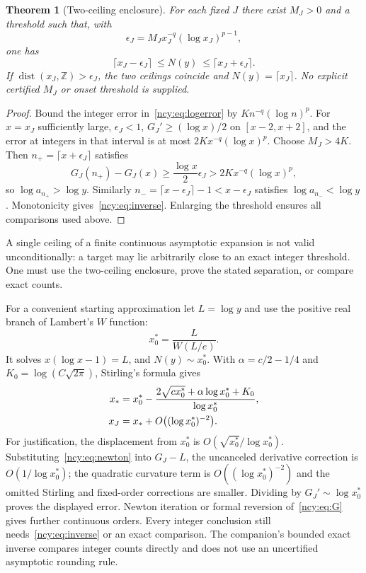 \documentclass[11pt,letterpaper]{article}
\numberwithin{equation}{section}
\newtheorem{theorem}{Theorem}[section]
\theoremstyle{remark}\newtheorem{remark}[theorem]{Remark}
\newcommand{\dist}{\operatorname{dist}}
\theoremstyle{definition}\newtheorem{definition}[theorem]{Definition}\theoremstyle{plain}
\begin{document}
\begin{theorem}[Two-ceiling enclosure]\label{ncy:thm:inverse}
For each fixed $J$ there exist $M_J>0$ and a threshold such that, with
\[
 \epsilon_J=M_Jx_J^{-q}(\log x_J)^{p-1},
\]
one has
\begin{equation}\label{ncy:eq:inverse}
 \lceil x_J-\epsilon_J\rceil\ \leq N(y)\ \leq
                       \lceil x_J+\epsilon_J\rceil.
\end{equation}
If $\dist(x_J,\mathbb Z)>\epsilon_J$, the two ceilings coincide and
$N(y)=\lceil x_J\rceil$. No explicit certified $M_J$ or onset threshold
is supplied.
\end{theorem}
\begin{proof}
Bound the integer error in~\eqref{ncy:eq:logerror} by
$Kn^{-q}(\log n)^p$. For $x=x_J$ sufficiently large,
$\epsilon_J<1$, $G_J'\geq(\log x)/2$ on $[x-2,x+2]$, and the
error at integers in that interval is at most $2Kx^{-q}(\log x)^p$.
Choose $M_J>4K$. Then $n_+=\lceil x+\epsilon_J\rceil$ satisfies
\[
 G_J(n_+)-G_J(x)\geq\frac{\log x}{2}\epsilon_J
                       >2Kx^{-q}(\log x)^p,
\]
so $\log a_{n_+}>\log y$. Similarly
$n_-=\lceil x-\epsilon_J\rceil-1<x-\epsilon_J$ satisfies
$\log a_{n_-}<\log y$. Monotonicity gives~\eqref{ncy:eq:inverse}.
Enlarging the threshold ensures all comparisons used above.
\end{proof}

A single ceiling of a finite continuous asymptotic expansion is not
valid unconditionally: a target may lie arbitrarily close to an exact
integer threshold. One must use the two-ceiling enclosure, prove the
stated separation, or compare exact counts.

For a convenient starting approximation let $L=\log y$ and use the
positive real branch of Lambert's $W$ function:
\begin{equation}\label{ncy:eq:W}
 x_0^*=\frac{L}{W(L/e)}.
\end{equation}
It solves $x(\log x-1)=L$, and $N(y)\sim x_0^*$. With
$\alpha=c/2-1/4$ and $K_0=\log(C\sqrt{2\pi})$, Stirling's formula gives
\begin{align}\label{ncy:eq:newton}
 x_*&=x_0^*-
 \frac{2\sqrt{cx_0^*}+\alpha\log x_0^*+K_0}{\log x_0^*},\\
 x_J&=x_*+O\bigl((\log x_0^*)^{-2}\bigr).\notag
\end{align}
For justification, the displacement from $x_0^*$ is
$O(\sqrt{x_0^*}/\log x_0^*)$. Substituting~\eqref{ncy:eq:newton} into
$G_J-L$, the uncanceled derivative correction is $O(1/\log x_0^*)$;
the quadratic curvature term is $O((\log x_0^*)^{-2})$ and the
omitted Stirling and fixed-order corrections are smaller. Dividing
by $G_J'\sim\log x_0^*$ proves the displayed error. Newton iteration
or formal reversion of~\eqref{ncy:eq:G} gives further continuous orders.
Every integer conclusion still needs~\eqref{ncy:eq:inverse} or an exact
comparison. The companion's bounded exact inverse compares integer
counts directly and does not use an uncertified asymptotic rounding
rule.
\end{document}
